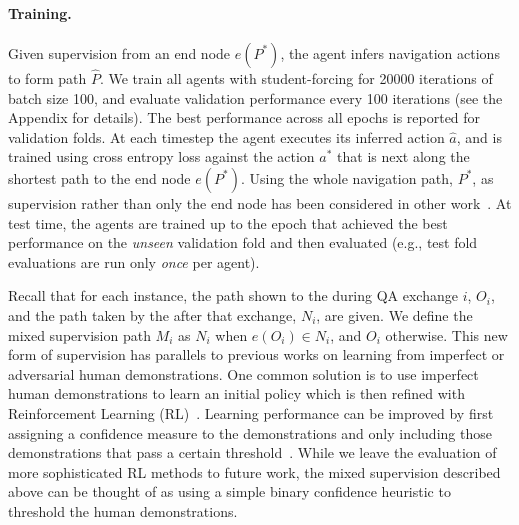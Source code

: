 \paragraph{Training.}
Given supervision from an end node $e(P^*)$, the agent infers navigation actions to form path $\hat{P}$.
We train all agents with student-forcing for 20000 iterations of batch size 100, and evaluate validation performance every 100 iterations (see the Appendix for details).
The best performance across all epochs is reported for validation folds.
At each timestep the agent executes its inferred action $\hat{a}$, and is trained using cross entropy loss against the action $a^*$ that is next along the shortest path to the end node $e(P^*)$.
Using the whole navigation path, $P^*$, as supervision rather than only the end node has been considered in other work~\cite{jain:acl19}.
At test time, the agents are trained up to the epoch that achieved the best performance on the \textit{unseen} validation fold and then evaluated (e.g., test fold evaluations are run only \textit{once} per agent).

Recall that for each \task{} instance, the path shown to the \ora{} during QA exchange $i$, $O_i$, and the path taken by the \nav{} after that exchange, $N_i$, are given.
We define the mixed supervision path $M_i$ as $N_i$ when $e(O_i)\in N_i$, and $O_i$ otherwise.
This new form of supervision has parallels to previous works on learning from imperfect or adversarial human demonstrations.
One common solution is to use imperfect human demonstrations to learn an initial policy which is then refined with Reinforcement Learning (RL)~\cite{taylor2011integrating}.
Learning performance can be improved by first assigning a confidence measure to the demonstrations and only including those demonstrations that pass a certain threshold~\cite{wang2017improving}.
While we leave the evaluation of more sophisticated RL methods to future work, the mixed supervision described above can be thought of as using a simple binary confidence heuristic to threshold the human demonstrations.

